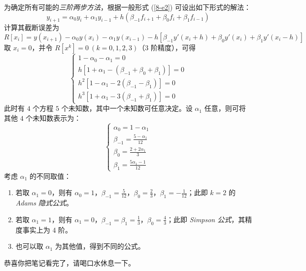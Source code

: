 \example 为确定所有可能的\emph{三阶两步方法}，根据一般形式 (\ref{8-e2}) 可设出如下形式的解法：
\[ y_{i+1}=\alpha_0y_i+\alpha_1y_{i-1}+h(\beta_{-1}f_{i+1}+\beta_0f_i+\beta_1
f_{i-1}) \]
计算其截断误差为
\[
R[x_i] = y(x_{i+1}) - \alpha_0y(x_i) - \alpha_1y(x_{i-1}) -h[\beta_{-1}y'(x_i+h)+\beta_0y'(x_i)+\beta_1y'(x_i-h)]
\]
取 $x_i=0$，并令 $ R[x^k] = 0\ (k=0,1,2,3)$（3 阶精度），可得
\[
\begin{cases}
1-\alpha_0-\alpha_1=0\\
h[1+\alpha_1-(\beta_{-1}+\beta_0+\beta_1)]=0\\
h^2[1-\alpha_1-2(\beta_{-1}-\beta_1)]=0\\
h^3[1+\alpha_1-3(\beta_{-1}+\beta_1)]=0
\end{cases}
\]
此时有 $4$ 个方程 $5$ 个未知数，其中一个未知数可任意决定。设 $\alpha_1$ 任意，则可将其他 $4$ 个未知数表示为：
\[\begin{cases}
\alpha_0=1-\alpha_1\\
\beta_{-1}=\frac{5-\alpha_1}{12}\\
\beta_0=\frac{2+2\alpha_1}3\\
\beta_1=\frac{5\alpha_1-1}{12}
\end{cases}\]
考虑 $\alpha_1$ 的不同取值：
\begin{enumerate}
\item 若取 $\alpha_1=0$，则有 $\alpha_0=1$，$\beta_{-1}=\frac5{12}$，$\beta_0=\frac23$，$\beta_1=-\frac1{12}$；此即 $k=2$ 的 \emph{Adams 隐式公式}。
\item 若取 $\alpha_1=1$，则有 $\alpha_1=0$，$\beta_{-1}=\beta_1=\frac13$，$\beta_0=\frac43$；此即 \emph{Simpson 公式}，其精度事实上为 4 阶。
\item 也可以取 $\alpha_1$ 为其他值，得到不同的公式。
\end{enumerate}

\entry 恭喜你把笔记看完了，请喝口水休息一下。